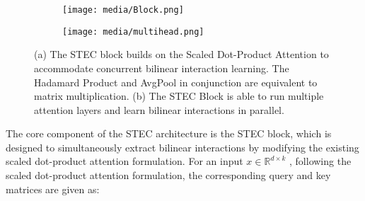 \documentclass{article}
\begin{document}
\begin{figure}
     \centering
     \begin{subfigure}[b]{0.45\textwidth}
         \centering
         \texttt{[image: media/Block.png]}
         \caption{}
         \label{fig:stec_block}
     \end{subfigure}
     \hfill
     \begin{subfigure}[b]{0.45\textwidth}
         \centering
         \texttt{[image: media/multihead.png]}
         \caption{}
         \label{fig:multihead}
     \end{subfigure}
        \caption{(a) The STEC block builds on the Scaled Dot-Product Attention to accommodate concurrent bilinear interaction learning. The Hadamard Product and AvgPool in conjunction are equivalent to matrix multiplication. (b) The STEC Block is able to run multiple attention layers and learn bilinear interactions in parallel.}
        \label{fig:inner_blocks}
\end{figure}


The core component of the STEC architecture is the STEC block, which is designed to simultaneously extract bilinear interactions by modifying the existing scaled dot-product attention formulation.
For an input $x \in \mathbb{R}^{d \times k}$ , following the scaled dot-product attention formulation, the corresponding query and key matrices are given as: 
\end{document}
